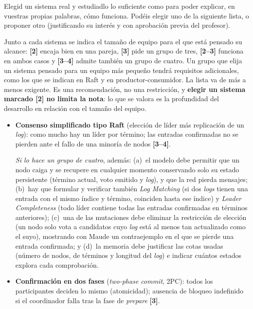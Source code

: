 \begin{listaejercicios}

\item\label{ej:eleccion}
Elegid un sistema real y estudiadlo lo suficiente como para poder explicar,
en vuestras propias palabras, c\'omo funciona. Pod\'eis elegir uno de la
siguiente lista, o proponer otro (justificando su inter\'es y con aprobaci\'on
previa del profesor).

Junto a cada sistema se indica el tama\~no de equipo para el que est\'a
pensado su alcance: \textbf{[2]} encaja bien en una pareja, \textbf{[3]}
pide un grupo de tres, \textbf{[2--3]} funciona en ambos casos y
\textbf{[3--4]} admite también un grupo de cuatro. Un grupo que elija un
sistema pensado para un equipo m\'as peque\~no tendr\'a requisitos
adicionales, como los que se indican en Raft y en productor-consumidor. La
lista va de m\'as a menos exigente. Es una recomendaci\'on, no una restricci\'on,
y \textbf{elegir un sistema marcado \textbf{[2]} no limita la nota}: lo que
se valora es la profundidad del desarrollo en relaci\'on con el tama\~no
del equipo.

\begin{itemize}
\item
\textbf{Consenso simplificado tipo Raft} (elecci\'on de l\'ider m\'as
replicaci\'on de un \emph{log}): como mucho hay un l\'ider por t\'ermino; las
entradas confirmadas no se pierden ante el fallo de una minor\'ia de nodos \textbf{[3--4]}.

\emph{Si lo hace un grupo de cuatro}, adem\'as:
(a)~el modelo debe permitir que un nodo caiga y se recupere en cualquier
momento conservando solo su estado persistente (t\'ermino actual, voto
emitido y \emph{log}), y que la red pierda mensajes;
(b)~hay que formular y verificar tambi\'en \emph{Log Matching} (si dos
\emph{logs} tienen una entrada con el mismo \'indice y t\'ermino, coinciden
hasta ese \'indice) y \emph{Leader Completeness} (todo l\'ider contiene todas
las entradas confirmadas en t\'erminos anteriores);
(c)~una de las mutaciones debe eliminar la restricci\'on de elecci\'on (un
nodo solo vota a candidatos cuyo \emph{log} est\'a al menos tan actualizado
como el suyo), mostrando con Maude un contraejemplo en el que se pierde una
entrada confirmada; y
(d)~la memoria debe justificar las cotas usadas (n\'umero de nodos, de
t\'erminos y longitud del \emph{log}) e indicar cu\'antos estados explora
cada comprobaci\'on.

\item
\textbf{Confirmaci\'on en dos fases} (\emph{two-phase commit}, 2PC): todos los
participantes deciden lo mismo (atomicidad); ausencia de bloqueo indefinido si
el coordinador falla tras la fase de \emph{prepare} \textbf{[3]}.


\end{itemize}
\end{listaejercicios}
